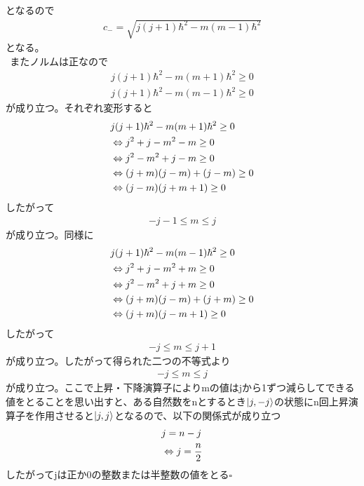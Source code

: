 \documentclass{jsarticle}  %
\numberwithin{equation}{section} %
\numberwithin{figure}{section}
\begin{document}
    となるので
    \begin{align}
        c_- = \sqrt{j(j+1)\hbar^2 - m(m - 1)\hbar^2 }
    \end{align}
    となる。\\
    $\ \ $またノルムは正なので
    \begin{align}
        j(j+1)\hbar^2 - m(m + 1)\hbar^2  \ge 0  \\
        j(j+1)\hbar^2 - m(m - 1)\hbar^2  \ge 0
    \end{align}
    が成り立つ。それぞれ変形すると
    \begin{align}
        &j(j+1)\hbar^2 - m(m + 1)\hbar^2  \ge 0 \notag \\
        &\Leftrightarrow j^2 + j-m^2-m \ge 0 \notag \\
        &\Leftrightarrow j^2-m^2 + j-m \ge 0 \notag \\
        &\Leftrightarrow (j+m)(j-m) + (j-m) \ge 0 \notag \\
        &\Leftrightarrow (j-m)(j+m+1) \ge 0
    \end{align}
    したがって
    \begin{align}
        -j-1\le m \le j
    \end{align}
    が成り立つ。同様に
    \begin{align}
        &j(j+1)\hbar^2 - m(m - 1)\hbar^2  \ge 0 \notag \\
        &\Leftrightarrow j^2 + j-m^2+m \ge 0 \notag \\
        &\Leftrightarrow j^2-m^2 + j+m \ge 0 \notag \\
        &\Leftrightarrow (j+m)(j-m) + (j+m) \ge 0 \notag \\
        &\Leftrightarrow (j+m)(j-m+1) \ge 0
    \end{align}
    したがって
    \begin{align}
        -j\le m \le j + 1
    \end{align}
    が成り立つ。したがって得られた二つの不等式より
    \begin{align}
        -j \le m \le j
    \end{align}
    が成り立つ。ここで上昇・下降演算子によりmの値はjから1ずつ減らしてできる値をとることを思い出すと、ある自然数をnとするとき$\ket{j,-j}$の状態にn回上昇演算子を作用させると$\ket{j,j}$となるので、以下の関係式が成り立つ
    \begin{align}
        &j=n-j \notag \\
        &\Leftrightarrow j = \frac{n}{2}
    \end{align}
    したがってjは正か0の整数または半整数の値をとる$\square$
\end{document}
